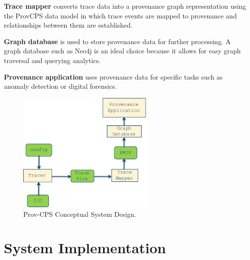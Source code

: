  \textbf{Trace mapper} converts trace data into a provenance graph representation using the ProvCPS data model in which trace events are mapped to provenance and relationships between them are established.
 
 \textbf{Graph database} is used to store provenance data for further processing. A graph database such as Neo4j is an ideal choice because it allows for easy graph traversal and querying analytics.
 
 \textbf{Provenance application} uses provenance data for specific tasks such as anomaly detection or digital forensics. %
 
 \begin{figure}[h!]
\begin{center}
\includegraphics[width=0.6\textwidth]{sys_arc_3_6.pdf}
\end{center}
\caption{Prov-CPS Conceptual System Design.}
\label{framework_design}
\end{figure}

\section{System Implementation} \label{system_implementation}

